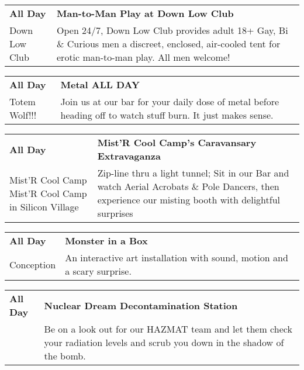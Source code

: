 \begin{tabular}{ p{1in} p{2.2in} }
    \textbf{All Day} & \textbf{Man-to-Man Play at Down Low Club} \\
    Down Low Club \newline  & Open 24/7, Down Low Club provides adult 18+ Gay, Bi \& Curious men a discreet, enclosed, air-cooled tent for erotic man-to-man play. All men welcome! \\
    \hline 
\end{tabular}
    
\begin{tabular}{ p{1in} p{2.2in} }
    \textbf{All Day} & \textbf{Metal ALL DAY } \\
    Totem Wolf!!! \newline  & Join us at our bar for your daily dose of metal before heading off to watch stuff burn. It just makes sense. \\
    \hline 
\end{tabular}
    
\begin{tabular}{ p{1in} p{2.2in} }
    \textbf{All Day} & \textbf{Mist'R Cool Camp's Caravansary Extravaganza} \\
    Mist'R Cool Camp \newline Mist'R Cool Camp in Silicon Village & Zip-line thru a light tunnel; Sit in our Bar and watch Aerial Acrobats \& Pole Dancers, then experience our misting booth with delightful surprises \\
    \hline 
\end{tabular}
    
\begin{tabular}{ p{1in} p{2.2in} }
    \textbf{All Day} & \textbf{Monster in a Box} \\
    Conception \newline  & An interactive art installation with sound, motion and a scary surprise. \\
    \hline 
\end{tabular}
    
\begin{tabular}{ p{1in} p{2.2in} }
    \textbf{All Day} & \textbf{Nuclear Dream Decontamination Station} \\
    ~ \newline  & Be on a look out for our HAZMAT team and let them check your radiation levels and scrub you down in the shadow of the bomb. \\
    \hline 
\end{tabular}
    
